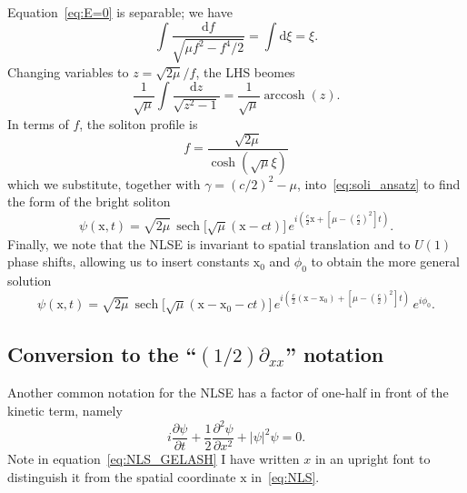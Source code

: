 \documentclass[11pt,a4paper]{article}
\DeclareMathOperator{\arccosh}{arccosh}
\DeclareMathOperator{\sech}{sech}
\begin{document}
Equation~\eqref{eq:E=0} is separable; we have
\begin{equation*}
	\int\! \frac{\mathrm{d}f}{\sqrt{\mu f^2 - f^4/2}} = \int\! \mathrm{d}\xi = \xi.
\end{equation*}
Changing variables to $z=\sqrt{2\mu}/f$, the LHS beomes
\begin{equation*}
	\frac{1}{\sqrt{\mu}} \int\! \frac{\mathrm{d} z}{\sqrt{z^2-1}} = \frac{1}{\sqrt{\mu}} \arccosh(z).
\end{equation*}
In terms of $f$, the soliton profile is
\begin{equation*}
	f = \frac{\sqrt{2\mu}}{\cosh(\sqrt{\mu}\xi)}
\end{equation*}
which we substitute, together with $\gamma = (c/2)^2 - \mu$, into~\eqref{eq:soli_ansatz} to find the form of the bright soliton
\begin{equation}
	\label{eq:soliton}
	\psi(\mathrm{x},t) 
		=  \sqrt{2\mu} \, \sech\!\big[\sqrt{\mu}(\mathrm{x}-ct)\big]  \, 
			e^{i\left(\frac{c}{2}\mathrm{x}+\left[\mu- \left(\frac{c}{2}\right)^2\right]t \right) }.
\end{equation}
Finally, we note that the NLSE is invariant to spatial translation and to $U(1)$ phase shifts, allowing us to insert constants $\mathrm{x}_0$ and $\phi_0$ to obtain the more general solution
\begin{equation}
	\label{eq:soliton_plus_consts}
	\psi(\mathrm{x},t) = \sqrt{2\mu} \, \sech\!\big[\sqrt{\mu}(\mathrm{x}-\mathrm{x}_0-ct)\big]  \, e^{i\left( \frac{c}{2}(\mathrm{x}-\mathrm{x}_0) + \left[\mu-\left(\frac{c}{2}\right)^2\right] t \right) } \, e^{i\phi_0}.
\end{equation}



\subsection{Conversion to the ``$(1/2)\partial_{xx}$'' notation}
\label{subsec:Gelash_notation}
 
Another common notation for the NLSE has a factor of one-half in front of the kinetic term, namely
\begin{equation}
	\label{eq:NLS_GELASH}
		i\frac{\partial \psi}{\partial t} + \frac{1}{2}\frac{\partial^2 \psi}{\partial x^2} + |\psi|^2 \psi =0.
\end{equation}
Note in equation~\eqref{eq:NLS_GELASH} I have written $x$ in an upright font to distinguish it from the spatial coordinate $\mathrm{x}$ in~\eqref{eq:NLS}. 
\end{document}
